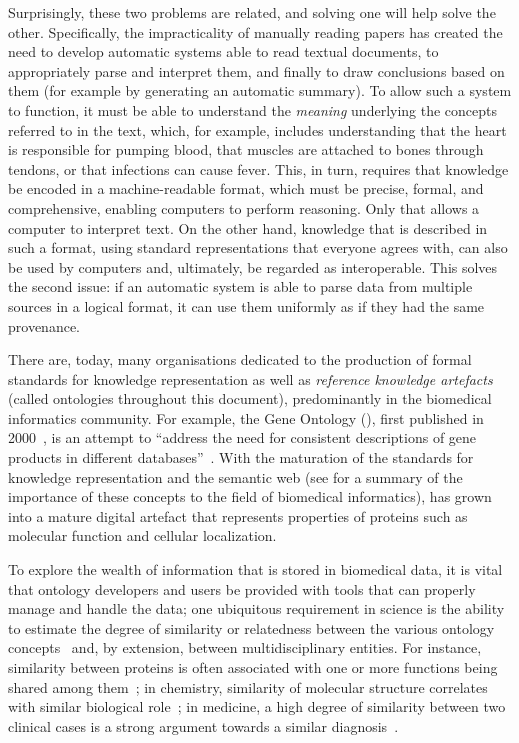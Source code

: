 Surprisingly, these two problems are related, and solving one will help solve the other. Specifically, the impracticality of manually reading papers has created the need to develop automatic systems able to read textual documents, to appropriately parse and interpret them, and finally to draw conclusions based on them (for example by generating an automatic summary). To allow such a system to function, it must be able to understand the \emph{meaning} underlying the concepts referred to in the text, which, for example, includes understanding that the heart is responsible for pumping blood, that muscles are attached to bones through tendons, or that infections can cause fever. This, in turn, requires that knowledge be encoded in a machine-readable format, which must be precise, formal, and comprehensive, enabling computers to perform reasoning. Only that allows a computer to interpret text. On the other hand, knowledge that is described in such a format, using standard representations that everyone agrees with, can also be used by computers and, ultimately, be regarded as interoperable. This solves the second issue: if an automatic system is able to parse data from multiple sources in a logical format, it can use them uniformly as if they had the same provenance.

There are, today, many organisations dedicated to the production of formal standards for knowledge representation as well as \emph{reference knowledge artefacts} (called ontologies throughout this document), predominantly in the biomedical informatics community. For example, the Gene Ontology (), first published in 2000~\citep{Ashburner2000}, is an attempt to ``address the need for consistent descriptions of gene products in different databases''~\citep{GOIntroduction}. With the maturation of the standards for knowledge representation and the semantic web (see  for a summary of the importance of these concepts to the field of biomedical informatics),  has grown into a mature digital artefact that represents properties of proteins such as molecular function and cellular localization.

To explore the wealth of information that is stored in biomedical data, it is vital that ontology developers and users be provided with tools that can properly manage and handle the data; one ubiquitous requirement in science is the ability to estimate the degree of similarity or relatedness between the various ontology concepts~\citep{Vision2011} and, by extension, between multidisciplinary entities. For instance, similarity between proteins is often associated with one or more functions being shared among them~\citep{Altschul1990}; in chemistry, similarity of molecular structure correlates with similar biological role~\citep{Hansch1964,Klebe1994}; in medicine, a high degree of similarity between two clinical cases is a strong argument towards a similar diagnosis~\citep{Swender1974}.

